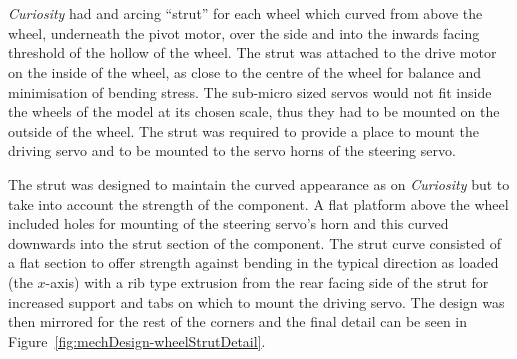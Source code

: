       \\\\
        \textit{Curiosity} had and arcing ``strut'' for each wheel which curved from above the wheel, underneath the pivot motor, over the side and into the inwards facing threshold of the hollow of the wheel. The strut was attached to the drive motor on the inside of the wheel, as close to the centre of the wheel for balance and minimisation of bending stress. The sub-micro sized servos would not fit inside the wheels of the model at its chosen scale, thus they had to be mounted on the outside of the wheel. The strut was required to provide a place to mount the driving servo and to be mounted to the servo horns of the steering servo.
        
        The strut was designed to maintain the curved appearance as on \textit{Curiosity} but to take into account the strength of the component. A flat platform above the wheel included holes for mounting of the steering servo's horn and this curved downwards into the strut section of the component. The strut curve consisted of a flat section to offer strength against bending in the typical direction as loaded (the $x$-axis) with a rib type extrusion from the rear facing side of the strut for increased support and tabs on which to mount the driving servo. The design was then mirrored for the rest of the corners and the final detail can be seen in Figure~\ref{fig:mechDesign-wheelStrutDetail}.
        
